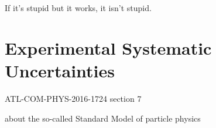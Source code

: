 \begin{savequote}[75mm]
If it's stupid but it works, it isn't stupid.
\end{savequote}

\chapter{Experimental Systematic Uncertainties}
\cite{supportnote} ATL-COM-PHYS-2016-1724 section 7

 about the so-called Standard Model of particle physics


